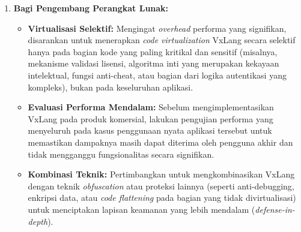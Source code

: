 \begin{enumerate}
    \item \textbf{Bagi Pengembang Perangkat Lunak:}
        \begin{itemize}
            \item \textbf{Virtualisasi Selektif:} Mengingat \textit{overhead} performa yang signifikan, disarankan untuk menerapkan \textit{code virtualization} VxLang secara selektif hanya pada bagian kode yang paling kritikal dan sensitif (misalnya, mekanisme validasi lisensi, algoritma inti yang merupakan kekayaan intelektual, fungsi anti-cheat, atau bagian dari logika autentikasi yang kompleks), bukan pada keseluruhan aplikasi.
            \item \textbf{Evaluasi Performa Mendalam:} Sebelum mengimplementasikan VxLang pada produk komersial, lakukan pengujian performa yang menyeluruh pada kasus penggunaan nyata aplikasi tersebut untuk memastikan dampaknya masih dapat diterima oleh pengguna akhir dan tidak mengganggu fungsionalitas secara signifikan.
            \item \textbf{Kombinasi Teknik:} Pertimbangkan untuk mengkombinasikan VxLang dengan teknik \textit{obfuscation} atau proteksi lainnya (seperti anti-debugging, enkripsi data, atau \textit{code flattening} pada bagian yang tidak divirtualisasi) untuk menciptakan lapisan keamanan yang lebih mendalam (\textit{defense-in-depth}).
        \end{itemize}


\end{enumerate}
